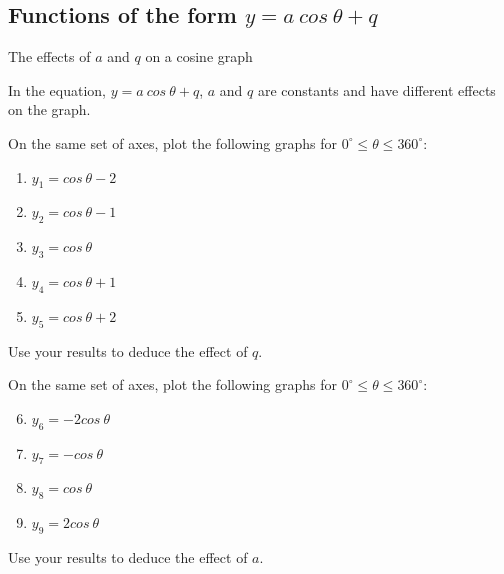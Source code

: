 \subsection*{Functions of the form $y=a~cos ~\theta +q$}
\begin{Investigation}{The effects of $a$ and $q$ on a cosine graph}
{In the equation, $y=a~cos ~\theta+q$, $a$ and $q$ are constants and have different effects on the graph.

On the same set of axes, plot the following graphs for $0^{\circ} \leq \theta \leq 360^{\circ}$:
\begin{enumerate}[noitemsep, label=\textbf{\arabic*}. ] 
\item $y_1=cos ~\theta -2$
\item $y_2=cos ~\theta -1$
\item $y_3=cos ~\theta $
\item $y_4=cos ~\theta +1$
\item $y_5=cos ~\theta +2$
\end{enumerate}
Use your results to deduce the effect of $q$.
\par
On the same set of axes, plot the following graphs for $0^{\circ} \leq \theta \leq 360^{\circ}$:
\begin{enumerate}[noitemsep, label=\textbf{\arabic*}. ] 
\setcounter{enumi}{5}
\item $y_6=-2cos ~\theta $
\item $y_7=-cos ~\theta $
\item $y_8=cos ~\theta $
\item $y_9=2cos ~\theta $\end{enumerate}
Use your results to deduce the effect of $a$.
}
\end{Investigation}

